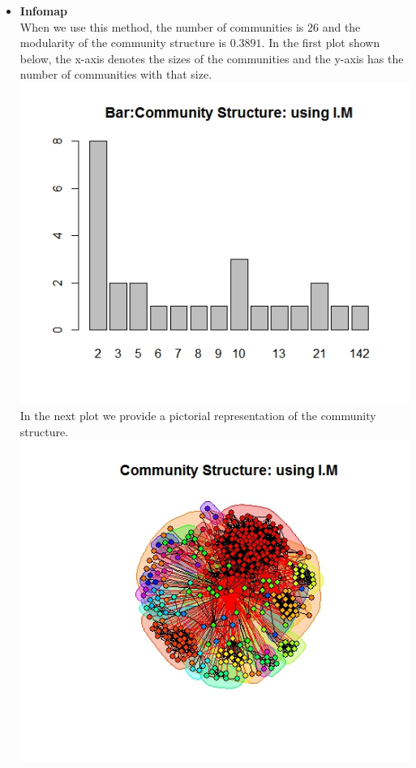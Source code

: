 \documentclass{article}
\begin{document}
\begin{itemize}
	\item \textbf{Infomap}\\
	When we use this method, the number of communities is $26$ and the modularity of the community
	structure is $0.3891$.
	In the first plot shown below, the x-axis denotes the sizes of the communities and the y-axis has the number of communities with that size.\\
	\includegraphics[scale=0.4]{q4f} \\
	In the next plot we provide a pictorial representation of the community structure.\\
	\includegraphics[scale=0.4]{q4g} \\ 
\end{itemize}
\end{document}

